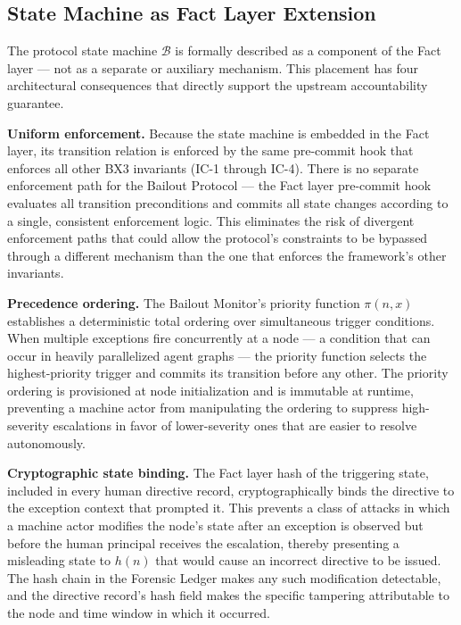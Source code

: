 \subsection{State Machine as Fact Layer Extension}\label{sec:state-machine-extension}

The protocol state machine $\mathcal{B}$ is formally described as a component
of the Fact layer — not as a separate or auxiliary mechanism.  This placement
has four architectural consequences that directly support the upstream
accountability guarantee.

\textbf{Uniform enforcement.} Because the state machine is embedded in the
Fact layer, its transition relation is enforced by the same pre-commit hook
that enforces all other BX3 invariants (IC-1 through IC-4).  There is no
separate enforcement path for the Bailout Protocol — the Fact layer pre-commit
hook evaluates all transition preconditions and commits all state changes
according to a single, consistent enforcement logic.  This eliminates the risk
of divergent enforcement paths that could allow the protocol's constraints to
be bypassed through a different mechanism than the one that enforces the
framework's other invariants.

\textbf{Precedence ordering.} The Bailout Monitor's priority function $\pi(n, x)$
establishes a deterministic total ordering over simultaneous trigger conditions.
When multiple exceptions fire concurrently at a node — a condition that can
occur in heavily parallelized agent graphs — the priority function selects the
highest-priority trigger and commits its transition before any other.
The priority ordering is provisioned at node initialization and is immutable
at runtime, preventing a machine actor from manipulating the ordering to suppress
high-severity escalations in favor of lower-severity ones that are easier to
resolve autonomously.

\textbf{Cryptographic state binding.} The Fact layer hash of the triggering state,
included in every human directive record, cryptographically binds the directive
to the exception context that prompted it.  This prevents a class of attacks in
which a machine actor modifies the node's state after an exception is observed
but before the human principal receives the escalation, thereby presenting a
misleading state to $h(n)$ that would cause an incorrect directive to be issued.
The hash chain in the Forensic Ledger makes any such modification detectable,
and the directive record's hash field makes the specific tampering attributable
to the node and time window in which it occurred.

